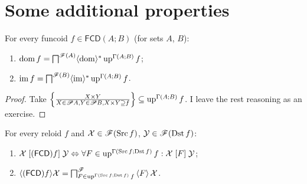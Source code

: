 \section{Some additional properties}
\begin{prop}
For every funcoid $f\in\mathsf{FCD}(A;B)$ (for sets $A$, $B$):
\begin{enumerate}
\item $\operatorname{dom} f=\bigsqcap^{\mathscr{F}(A)}\langle\operatorname{dom}\rangle^{\ast}\operatorname{up}^{\Gamma(A;B)}f$;
\item $\operatorname{im} f=\bigsqcap^{\mathscr{F}(B)}\langle\operatorname{im}\rangle^{\ast}\operatorname{up}^{\Gamma(A;B)}f$.
\end{enumerate}
\end{prop}
\begin{proof}
Take $\left\{ \frac{X\times Y}{X\in\mathscr{P} A,Y\in\mathscr{P} B,X\times Y\supseteq f}\right\}\subseteq\operatorname{up}^{\Gamma(A;B)}f$.
I leave the rest reasoning as an exercise.\end{proof}
\begin{thm}
For every reloid $f$ and $\mathcal{X}\in\mathscr{F}(\operatorname{Src} f)$, $\mathcal{Y}\in\mathscr{F}(\operatorname{Dst} f)$:
\begin{enumerate}
\item \label{fcd-up-g-rel}$\mathcal{X}\mathrel{[(\mathsf{FCD}) f]}\mathcal{Y}\Leftrightarrow\forall F\in\operatorname{up}^{\Gamma(\operatorname{Src} f;\operatorname{Dst} f)}f:\mathcal{X}\mathrel{\left[F\right]}\mathcal{Y}$;
\item \label{fcd-up-g-fcd}$\langle(\mathsf{FCD}) f\rangle\mathcal{X}=\bigsqcap_{F\in\operatorname{up}^{\Gamma(\operatorname{Src} f;\operatorname{Dst} f)}f}^{\mathscr{F}}\left\langle F\right\rangle\mathcal{X}$.
\end{enumerate}
\end{thm}
